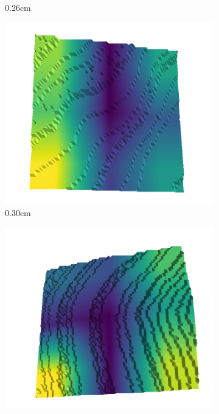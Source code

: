 \documentclass[../document.tex]{subfiles}
\begin{document}
\begin{figure}[H]
\begin{subfigure}[b]{0.192\linewidth}
    \caption{0.26cm}
    \label{fig : quarry-best-2}
    \end{subfigure}
    \begin{subfigure}[b]{0.192\linewidth}
    \includegraphics[width=\linewidth]{../img/5/quarry/best/30-patch-3d-majavi-colormap-20.png}
    \caption{0.30cm}
    \label{fig : quarry-best-3}
    \end{subfigure}
    \begin{subfigure}[b]{0.192\linewidth}
    \includegraphics[width=\linewidth]{../img/5/quarry/best/34-patch-3d-majavi-colormap-30.png}

\end{subfigure}
\end{figure}
\end{document}
